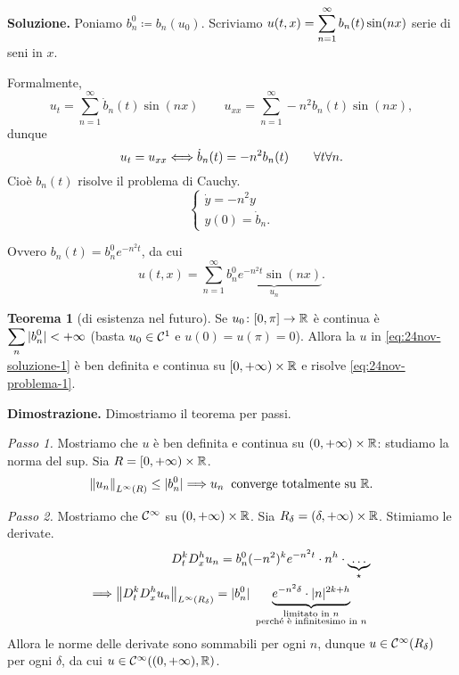 \textbf{Soluzione.} Poniamo $b_n^0 \coloneqq b_n (u_0)$.
Scriviamo $\displaystyle u(t,x) = \sum_{n=1}^{\infty} b_n(t) \sin(nx) $ serie di seni in $x$.

Formalmente,
%
$$
	u_t = \sum_{n=1}^\infty \dot b_n(t) \sin(nx) \qquad 
	u_{xx} = \sum_{n=1}^{\infty} -n^2 b_n(t) \sin(nx),
$$
%
dunque
%
$$
	u_t = u_{xx} \Longleftrightarrow \dot b_n(t) = -n^2 b_n(t) \qquad \forall t \forall n.
$$
%
Cioè $b_n(t)$ risolve il problema di Cauchy.
\begin{equation}
	\label{eq:24nov-problema-2} \tag{P'}
	\begin{cases}
		\dot y = -n^2 y \\
		y(0) = \dot b_n.
	\end{cases}
\end{equation}

Ovvero $b_n(t) = b_n^0 e^{-n^2 t}$, da cui  
\begin{equation}
\label{eq:24nov-soluzione-1} \tag{$\ast$}
	u(t,x) = \sum_{n=1}^\infty \underbrace{b_n^0 e^{-n^2t} \sin(nx)}_{u_n}.
\end{equation}


\textbf{Teorema 1} (di esistenza nel futuro).
Se $u_0 \colon [0,\pi] \to \mathbb R$ è continua è $\displaystyle \sum_n |b_n^0| < +\infty$ (basta $u_0 \in \mathcal{C}^1$ e $u(0) = u(\pi) = 0$).
Allora la $u$ in \eqref{eq:24nov-soluzione-1} è ben definita e continua su $[0,+\infty) \times \mathbb R$ e risolve \eqref{eq:24nov-problema-1}.

\textbf{Dimostrazione.} Dimostriamo il teorema per passi.

\textit{Passo 1.}
Mostriamo che $u$ è ben definita e continua su $(0,+\infty) \times \mathbb R$: studiamo la norma del sup. Sia $R = [0, +\infty) \times \mathbb R$.
%
$$
	\left\lVert u_n \right\rVert_{L^\infty(R)} \leq |b_n^0| \Longrightarrow u_n \;\; \text{converge totalmente su } \mathbb R.
$$
%

\textit{Passo 2.} Mostriamo che $\mathcal{C}^\infty$ su $(0,+\infty) \times \mathbb R$.
Sia $R_\delta = (\delta, +\infty) \times \mathbb R$.
Stimiamo le derivate.
\begin{align*}
	D_t^k D_x^h u_n = b_n^0 (-n^2)^k e^{-n^2t} \cdot n^h \cdot \underbrace{\ldots}_{\star} \\
	\Longrightarrow \left\lVert D_t^k D_x^h u_n \right\rVert_{L^\infty(R_\delta)} 
	= |b_n^0| \underbrace{e^{-n^2\delta} \cdot |n|^{2k+h}}_{\substack{\text{limitato in $n$} \\ \text{ perché è infinitesimo in $n$ }}}
\end{align*}
Allora le norme delle derivate sono sommabili per ogni $n$, dunque $u \in \mathcal{C}^\infty(R_\delta)$ per ogni $\delta$, da cui $u \in \mathcal{C}^\infty( (0,+\infty),\mathbb R)$.

